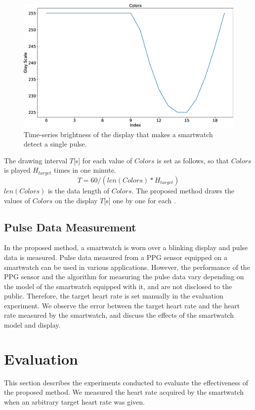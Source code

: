\documentclass[sigchi,authordraft]{acmart}
\begin{document}
\begin{figure}[!t]
  \centering
  \includegraphics[width=0.5\linewidth]{figures/colors_wave.eps}
  \caption{Time-series brightness of the display that makes a smartwatch detect a single pulse.}
  \label{fig:colors_wave}
\end{figure}

The drawing interval $T$[s] for each value of $Colors$ is set as follows, so that $Colors$ is played $H_{target}$ times in one minute.
\begin{equation}
  \label{eqn:wait}
  T = 60 / (len(Colors) * H_{target})
\end{equation}
$len(Colors)$ is the data length of $Colors$. The proposed method draws the values of $Colors$ on the display $T$[s] one by one for each .


\subsection{Pulse Data Measurement}
In the proposed method, a smartwatch is worn over a blinking display and pulse data is measured. Pulse data measured from a PPG sensor equipped on a smartwatch can be used in various applications. However, the performance of the PPG sensor and the algorithm for measuring the pulse data vary depending on the model of the smartwatch equipped with it, and are not disclosed to the public. Therefore, the target heart rate is set manually in the evaluation experiment. We observe the error between the target heart rate and the heart rate measured by the smartwatch, and discuss the effects of the smartwatch model and display.



\section{Evaluation}
\label{sec:evaluation}
This section describes the experiments conducted to evaluate the effectiveness of the proposed method. We measured the heart rate acquired by the smartwatch when an arbitrary target heart rate was given.
\end{document}
